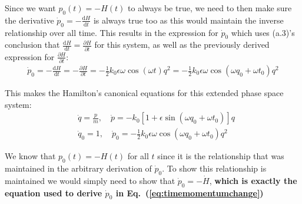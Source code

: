 \documentclass[titlepage]{article}
\begin{document}
Since we want $p_0(t)=-H(t)$ to always be true, we need to then make sure the derivative $\dot{p}_0=-\frac{\mathrm{d}H}{\mathrm{d}t}$ is always true too as this would maintain the inverse relationship over all time. This results in the expression for $\dot{p}_0$ which uses (a.3)'s conclusion that $\frac{\mathrm{d}H}{\mathrm{d}t}=\frac{\partial H}{\partial t}$ for this system, as well as the previously derived expression for $\frac{\partial H}{\partial t}$:
\begin{equation}
	\begin{split}
		\dot{p}_0=-\frac{\mathrm{d}H}{\mathrm{d}t}=-\frac{\partial H}{\partial t}=-\frac{1}{2}k_0\epsilon\omega\cos(\omega t)q^2=-\frac{1}{2}k_0\epsilon\omega\cos(\omega q_0+\omega t_0)q^2
	\end{split}
	\label{eq:timemomentumchange}
\end{equation}

\begin{mdframed}[linewidth=1pt, innertopmargin=10pt, innerbottommargin=10pt]
	This makes the Hamilton's canonical equations for this extended phase space system:
	\begin{equation}
		\begin{split}
			&\dot{q}=\frac{p}{m},\quad\dot{p}=-k_0\left[1+\epsilon\sin\left(\omega q_0+\omega t_0\right)\right]q \\
			&\dot{q}_0=1,\quad\dot{p}_0=-\frac{1}{2}k_0\epsilon\omega\cos(\omega q_0+\omega t_0)q^2
		\end{split}
	\end{equation}
	
	We know that $p_0(t)=-H(t)$ for all $t$ since it is the relationship that was maintained in the arbitrary derivation of $\dot{p}_0$. To show this relationship is maintained we would simply need to show that $\dot{p}_0=-\dot{H}$, \textbf{which is exactly the equation used to derive $\dot{p}_0$ in Eq.~(\ref{eq:timemomentumchange})}
\end{mdframed}

\newpage
\end{document}

